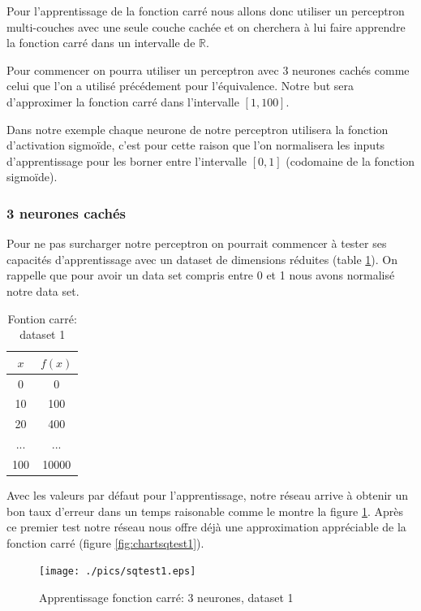 \documentclass[twoside,openright,a4paper,11pt,french]{article}
\begin{document}
Pour l'apprentissage de la fonction carré nous allons donc utiliser un perceptron
multi-couches avec une seule couche cachée et on cherchera à lui faire apprendre
la fonction carré dans un intervalle de $\mathbb{R}$.

Pour commencer on pourra utiliser un perceptron avec 3 neurones cachés comme
celui que l'on a utilisé précédement pour l'équivalence. Notre but sera
d'approximer la fonction carré dans l'intervalle $[1,100]$.

Dans notre exemple chaque neurone de notre perceptron utilisera la fonction
d'activation sigmoïde, c'est pour cette raison que l'on normalisera les inputs
d'apprentissage pour les borner entre l'intervalle $[0,1]$ (codomaine de la
fonction sigmoïde).

\subsubsection{3 neurones cachés}

Pour ne pas surcharger notre  perceptron on pourrait commencer à tester
ses capacités d'apprentissage avec un dataset de dimensions réduites (table
\ref{tab:fqt1}). On rappelle que pour avoir un data set compris entre 0 et 1
nous avons normalisé notre data set.

\begin{table}[ht]
  \centering
  \begin{tabular}{| c | c |}
    \hline
    \textbf{$x$} & \textbf{$f(x)$}\\
    \hline
    0 & 0 \\
    \hline
    10 & 100 \\
    \hline
    20 & 400 \\
    \hline
    ... & ... \\
    \hline
    100 & 10000 \\
    \hline
  \end{tabular}
  \caption{Fontion carré: dataset 1}
  \label{tab:fqt1}
\end{table}

Avec les valeurs par défaut pour l'apprentissage, notre réseau arrive à obtenir
un bon taux d'erreur dans un temps raisonable comme le montre la figure
\ref{fig:sqtest1}. Après ce premier test notre réseau nous offre déjà une
approximation appréciable de la fonction carré (figure \ref{fig:chartsqtest1}).

\begin{figure}[ht]
\centering
\texttt{[image: ./pics/sqtest1.eps]}
\caption{Apprentissage fonction carré: 3 neurones, dataset 1}
\label{fig:sqtest1}
\end{figure}
\end{document}
